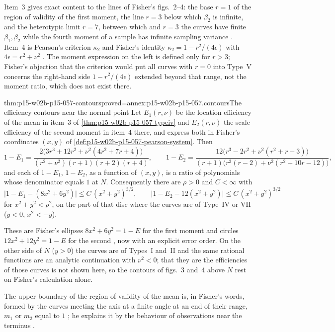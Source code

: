 Item~3 gives exact content to the lines of Fisher's figs.~2--4: the base
\(r=1\) of the region of validity of the first moment, the line \(r=3\)
below which \(\beta_2\) is infinite, and the heterotypic limit \(r=7\),
between which and \(r=3\) the curves have finite \(\beta_1,\beta_2\) while
the fourth moment of a sample has infinite sampling variance
\cite[pp.~345--347]{Fisher1922Foundations}. Item~4 is Pearson's criterion
\(\kappa_2\) and Fisher's identity \(\kappa_2=1-r^2/(4\epsilon)\) with
\(4\epsilon=r^2+\nu^2\) \cite[p.~345]{Fisher1922Foundations}. The moment
expression on the left is defined only for \(r>3\); Fisher's objection
that the criterion would put all curves with \(r=0\) into Type~V concerns
the right-hand side \(1-r^2/(4\epsilon)\) extended beyond that range, not
the moment ratio, which does not exist there.

\begin{hbtheorem}{thm:p15-w02b-p15-057-contours}{proved=annex:p15-w02b-p15-057.contours}{The efficiency contours near the normal point}
Let \(E_1(r,\nu)\) be the location efficiency of the mean in item~3 of
\cref{thm:p15-w02b-p15-057-typeiv} and \(E_2(r,\nu)\) the scale efficiency
of the second moment in item~4 there, and express both in Fisher's
coordinates \((x,y)\) of \cref{def:p15-w02b-p15-057-pearson-system}. Then
\[
 1-E_1=\frac{2\bigl(3r^3+12r^2+\nu^2(4r^2+7r+4)\bigr)}
 {(r^2+\nu^2)(r+1)(r+2)(r+4)},\qquad
 1-E_2=\frac{12\bigl(r^3-2r^2+\nu^2(r^2+r-3)\bigr)}
 {(r+1)\bigl(r^3(r-2)+\nu^2(r^2+10r-12)\bigr)},
\]
and each of \(1-E_1\), \(1-E_2\), as a function of \((x,y)\), is a ratio of
polynomials whose denominator equals \(1\) at \(N\). Consequently there
are \(\rho>0\) and \(C<\infty\) with
\[
 \bigl|1-E_1-(8x^2+6y^2)\bigr|\leq C\,(x^2+y^2)^{3/2},\qquad
 \bigl|1-E_2-12(x^2+y^2)\bigr|\leq C\,(x^2+y^2)^{3/2}
\]
for \(x^2+y^2<\rho^2\), on the part of that disc where the curves are of
Type~IV or VII (\(y<0\), \(x^2<-y\)).
\end{hbtheorem}

These are Fisher's ellipses \(8x^2+6y^2=1-E\) for the first moment and
circles \(12x^2+12y^2=1-E\) for the second
\cite[p.~347]{Fisher1922Foundations}, now with an explicit error order. On
the other side of \(N\) (\(y>0\)) the curves are of Types~I and~II and the
same rational functions are an analytic continuation with \(\nu^2<0\); that
they are the efficiencies of those curves is not shown here, so the
contours of figs.~3 and~4 above \(N\) rest on Fisher's calculation alone.

The upper boundary of the region of validity of the mean is, in Fisher's
words, formed by the curves meeting the axis at a finite angle at an end of
their range, \(m_1\) or \(m_2\) equal to \(1\)
\cite[p.~346]{Fisher1922Foundations}; he explains it by the behaviour of
observations near the terminus \cite[pp.~347--348]{Fisher1922Foundations}.

